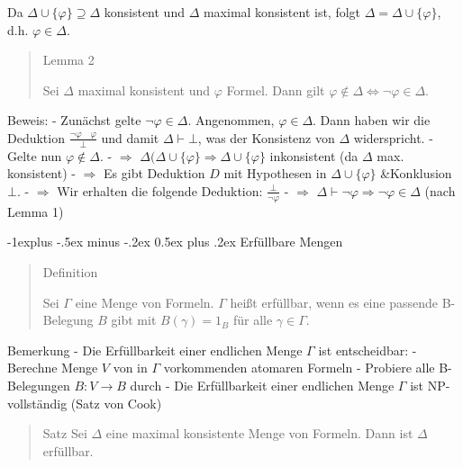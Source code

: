 \documentclass[a4paper]{article}
\makeatletter
\renewcommand{\subsection}{\@startsection{subsection}{2}{0mm}%
                {-1explus -.5ex minus -.2ex}%
                {0.5ex plus .2ex}%
                {\normalfont\normalsize\bfseries}}
\makeatother
\begin{document}
\begin{multicols}{3}
  \begin{enumerate*}
    \setcounter{enumi}{1}
    \itemsep1pt\parskip0pt
    \item
          Da $\Delta\cup\{\varphi\}\supseteq\Delta$ konsistent und $\Delta$
          maximal konsistent ist, folgt $\Delta=\Delta\cup\{\varphi\}$, d.h.
          $\varphi\in\Delta$.
  \end{enumerate*}

  \begin{quote}
    Lemma 2

    Sei $\Delta$ maximal konsistent und $\varphi$ Formel. Dann gilt
    $\varphi\not\in\Delta\Leftrightarrow\lnot\varphi\in\Delta$.
  \end{quote}

  Beweis: - Zunächst gelte $\lnot\varphi\in\Delta$. Angenommen,
  $\varphi\in\Delta$. Dann haben wir die Deduktion
  $\frac{\lnot\varphi\quad\varphi}{\bot}$ und damit $\Delta\vdash\bot$,
  was der Konsistenz von $\Delta$ widerspricht. - Gelte nun
  $\varphi\not\in\Delta$. - $\Rightarrow$
  $\Delta(\Delta\cup\{\varphi\}\Rightarrow\Delta\cup\{\varphi\}$
  inkonsistent (da $\Delta$ max. konsistent) - $\Rightarrow$ Es gibt
  Deduktion $D$ mit Hypothesen in $\Delta\cup\{\varphi\}$ \&Konklusion
  $\bot$. - $\Rightarrow$ Wir erhalten die folgende Deduktion:
  $\frac{\bot}{\lnot\varphi}$ - $\Rightarrow$
  $\Delta\vdash\lnot\varphi\Rightarrow\lnot\varphi\in\Delta$ (nach Lemma
  1)

  \subsection{Erfüllbare Mengen}\label{erfuxfcllbare-mengen}

  \begin{quote}
    Definition

    Sei $\Gamma$ eine Menge von Formeln. $\Gamma$ heißt erfüllbar, wenn es
    eine passende B-Belegung $B$ gibt mit $B(\gamma) = 1_B$ für alle
    $\gamma\in\Gamma$.
  \end{quote}

  Bemerkung - Die Erfüllbarkeit einer endlichen Menge $\Gamma$ ist
  entscheidbar: - Berechne Menge $V$ von in $\Gamma$ vorkommenden atomaren
  Formeln - Probiere alle B-Belegungen $B:V\rightarrow B$ durch - Die
  Erfüllbarkeit einer endlichen Menge $\Gamma$ ist NP-vollständig (Satz
  von Cook)

  \begin{quote}
    Satz Sei $\Delta$ eine maximal konsistente Menge von Formeln. Dann ist
    $\Delta$ erfüllbar.
  \end{quote}


\end{multicols}
\end{document}
